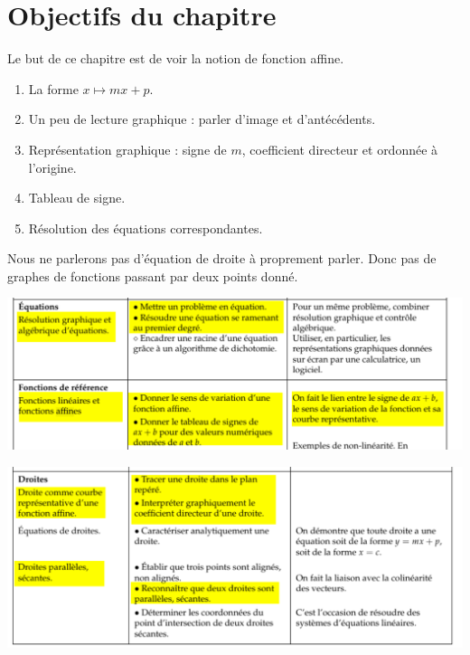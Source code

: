 
\section{Objectifs du chapitre}

Le but de ce chapitre est de voir la notion de fonction affine.
\begin{enumerate}
    \item
        La forme \( x\mapsto mx+p\).
    \item
        Un peu de lecture graphique : parler d'image et d'antécédents.
    \item
        Représentation graphique : signe de \( m\), coefficient directeur et ordonnée à l'origine.
    \item
        Tableau de signe.
    \item
        Résolution des équations correspondantes.
\end{enumerate}
Nous ne parlerons pas d'équation de droite à proprement parler. Donc pas de graphes de fonctions passant par deux points donné.

\includegraphics[width=\linewidth]{BO_fonctions_affines1.pdf}

\vspace{1cm}

\includegraphics[width=\linewidth]{BO_fonctions_affines2.pdf}

